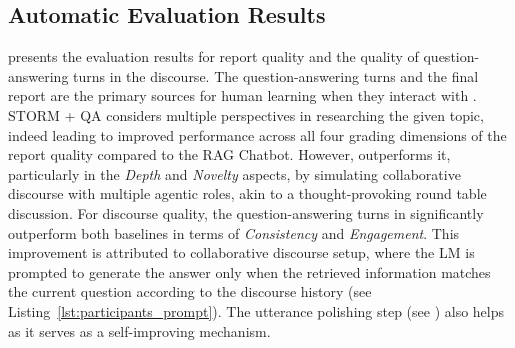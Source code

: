 \subsection{Automatic Evaluation Results}
\label{sec:automatic_evaluation_results}
 presents the evaluation results for report quality and the quality of question-answering turns in the discourse. The question-answering turns and the final report are the primary sources for human learning when they interact with \system. STORM + QA considers multiple perspectives in researching the given topic, indeed leading to improved performance across all four grading dimensions of the report quality compared to the RAG Chatbot. However, \system outperforms it, particularly in the \textit{Depth} and \textit{Novelty} aspects, by simulating collaborative discourse with multiple agentic roles, akin to a thought-provoking round table discussion. %
For discourse quality, the question-answering turns in \system significantly outperform both baselines in terms of \textit{Consistency} and \textit{Engagement}. This improvement is attributed to collaborative discourse setup, where the LM is prompted to generate the answer only when the retrieved information matches the current question according to the discourse history (see Listing~\ref{lst:participants_prompt}). The utterance polishing step (see ) also helps as it serves as a self-improving mechanism.




